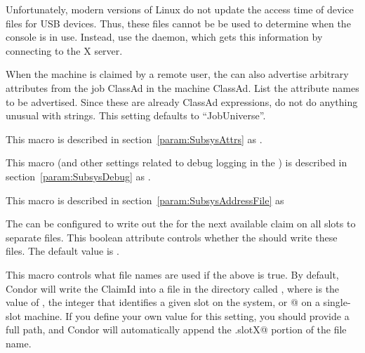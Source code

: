 \begin{description}
  Unfortunately, modern versions of Linux do not update the access time of
  device files for USB devices. Thus, these files cannot be be used to
  determine when the console is in use. Instead, use the  daemon,
  which gets this information by connecting to the X server.
  
\label{param:StartdJobExprs}
\item[\Macro{STARTD\_JOB\_EXPRS}]
  When the machine is claimed by a remote user,
  the  can also advertise
  arbitrary attributes from the job ClassAd in the machine ClassAd.
  List the attribute names to be advertised.  \Note Since
  these are already ClassAd expressions, do not do anything
  unusual with strings.   
  This setting defaults to ``JobUniverse''.

\label{param:StartdAttrs}
\item[\Macro{STARTD\_ATTRS}]
  This macro is described in section~\ref{param:SubsysAttrs} as
  .

\label{param:StartdDebug}
\item[\Macro{STARTD\_DEBUG}]
  This macro
  (and other settings related to debug logging in the ) is
  described in section~\ref{param:SubsysDebug} as
  .

\label{param:StartdAddressFile}
\item[\Macro{STARTD\_ADDRESS\_FILE}]
  This macro is described in section~\ref{param:SubsysAddressFile} as

\label{param:StartdShouldWriteClaimIdFile}
\item[\Macro{STARTD\_SHOULD\_WRITE\_CLAIM\_ID\_FILE}]
  The  can be configured
  to write out the  for the next available claim on all
  slots to separate files.
  This boolean attribute controls whether the  should
  write these files.
  The default value is .
  
\label{param:StartdClaimIdFile}
\item[\Macro{STARTD\_CLAIM\_ID\_FILE}]
  This macro controls what file names are used if the above
   is true.  By
  default, Condor will write the ClaimId into a file in the
   directory called , where
  \verb@X@ is the value of , the integer that
  identifies a given slot on the system, or @ on a
  single-slot machine.
  If you define your own value for this setting, you should provide a
  full path, and Condor will automatically append the \verb@.slotX@
  portion of the file name.


\end{description}
